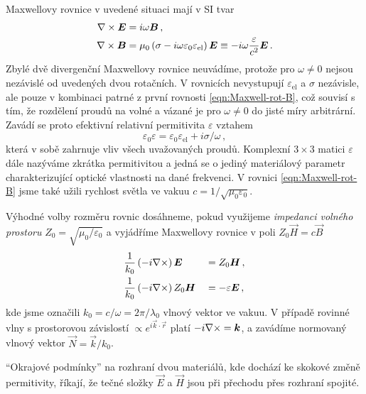 Maxwellovy rovnice v uvedené situaci mají v SI tvar
\begin{align}
    \nabla\times \bm{E}&=i\omega\bm{B} \,, \label{eqn:Maxwell-rot-E} \\
    \nabla\times \bm{B}&=\mu_0 \left( \sigma - i\omega \varepsilon_0 \varepsilon_{\textrm{el}} \right) \bm{E} 
        \equiv -i\omega\frac{\varepsilon}{c^2} \bm{E} \,. \label{eqn:Maxwell-rot-B}
\end{align}
Zbylé dvě divergenční Maxwellovy rovnice neuvádíme, protože pro $\omega\neq 0$ nejsou nezávislé od uvedených dvou rotačních.
V rovnicích nevystupují $\varepsilon_{\textrm{el}}$ a $\sigma$ nezávisle, ale pouze v kombinaci patrné z první rovnosti \eqref{eqn:Maxwell-rot-B}, což souvisí s tím, že rozdělení proudů na volné a vázané je pro $\omega\neq 0$ do jisté míry arbitrární.
Zavádí se proto efektivní relativní permitivita $\varepsilon$ vztahem
\begin{equation}
    \varepsilon_0 \varepsilon=\varepsilon_0 \varepsilon_{\textrm{el}}+i\sigma/\omega \,,
\end{equation}
která v sobě zahrnuje vliv všech uvažovaných proudů.
Komplexní $3\times 3$ matici $\varepsilon$ dále nazýváme zkrátka permitivitou a jedná se o jediný materiálový parametr charakterizující optické vlastnosti na dané frekvenci.
V rovnici \eqref{eqn:Maxwell-rot-B} jsme také užili rychlost světla ve vakuu $c=1/\sqrt{\mu_0 \varepsilon_0}$.

Výhodné volby rozměru rovnic dosáhneme, pokud využijeme \emph{impedanci volného prostoru} $Z_0 = \sqrt{\mu_0/\varepsilon_0}$ a vyjádříme Maxwellovy rovnice v poli $Z_0 \vec{H}=c \vec{B}$
\begin{alignat}{2}
    & \frac{1}{k_0} \left( -i \nabla\times \right) \bm{E} &&= Z_0 \bm{H} \,, \label{eqn:rot-E}\\
    & \frac{1}{k_0} \left( -i \nabla\times \right) Z_0 \bm{H} &&=-\varepsilon \bm{E} \,, \label{eqn:rot-ZH}
\end{alignat}
kde jsme označili $k_0 = c/\omega = 2\pi/\lambda_0$ vlnový vektor ve vakuu.
V případě rovinné vlny s prostorovou závislostí $\propto e^{i \vec{k}\cdot \vec{r}}$ platí $-i \nabla\times = \bm{k}$, a zavádíme normovaný vlnový vektor $\vec{N}=\vec{k}/k_0$.

``Okrajové podmínky'' na rozhraní dvou materiálů, kde dochází ke skokové změně permitivity, říkají, že tečné složky $\vec{E}$ a $\vec{H}$ jsou při přechodu přes rozhraní spojité\cite{bornPrinciplesOpticsElectromagnetic1999}.
